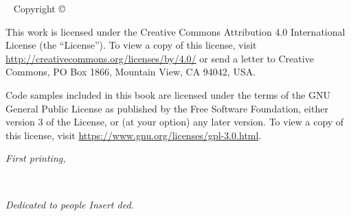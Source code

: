 \frontmatter
\blankpage
{
  \let\allcaps=\relax
  \maketitle
}

\newpage
\begin{fullwidth}
~\vfill
\thispagestyle{empty}
\setlength{\parindent}{0pt}
\setlength{\parskip}{\baselineskip}
Copyright \copyright\ \the\year\ \thanklessauthor

\par{}

\par{}

\par This work is licensed under the Creative Commons Attribution 4.0 International License (the ``License''). 
To view a copy of this license, visit \url{http://creativecommons.org/licenses/by/4.0/} or send a letter to Creative Commons, PO Box 1866, Mountain View, CA 94042, USA. 

\par Code samples included in this book are licensed under the terms of the GNU General Public License as published by the Free Software Foundation, either version 3 of the License, or (at your option) any later version. 
To view a copy of this license, visit \url{https://www.gnu.org/licenses/gpl-3.0.html}.

\par\textit{First printing, \monthyear}
\end{fullwidth}

\tableofcontents

\listoffigures

\listoftables

\cleardoublepage
~\vfill
\begin{doublespace}
\noindent\fontsize{18}{22}\selectfont\itshape
\nohyphenation
Dedicated to people \TODO Insert ded.
\end{doublespace}
\vfill
\vfill

